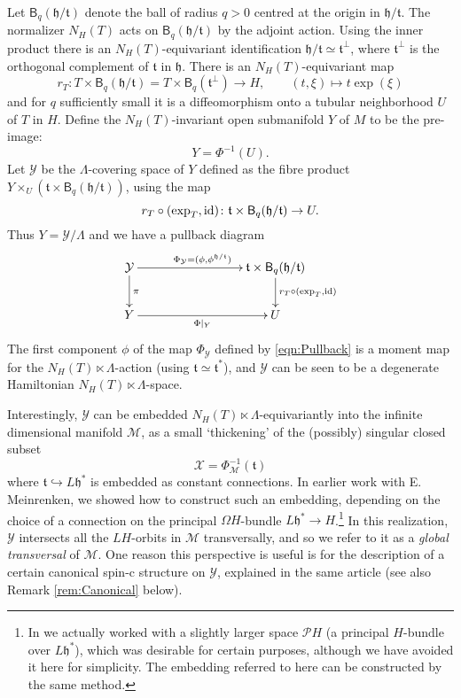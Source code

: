 \documentclass[11pt,reqno]{amsart}
\theoremstyle{definition}
\theoremstyle{remark}
\newcommand{\st}[1]{\mathsf{#1}}
\def\t{\ensuremath{\mathfrak{t}}}
\def\h{\ensuremath{\mathfrak{h}}}
\def\P{\ensuremath{\mathcal{P}}}
\def\Y{\ensuremath{\mathcal{Y}}}
\def\X{\ensuremath{\mathcal{X}}}
\def\M{\ensuremath{\mathcal{M}}}
\def\id{\ensuremath{\textnormal{id}}}
\begin{document}
Let $\st{B}_q(\h/\t)$ denote the ball of radius $q>0$ centred at the origin in $\h/\t$.  The normalizer $N_H(T)$ acts on $\st{B}_q(\h/\t)$ by the adjoint action.  Using the inner product there is an $N_H(T)$-equivariant identification $\h/\t \simeq \t^\perp$, where $\t^\perp$ is the orthogonal complement of $\t$ in $\h$.  There is an $N_H(T)$-equivariant map
\[ r_T \colon T \times \st{B}_q(\h/\t)=T \times \st{B}_q(\t^\perp) \rightarrow H, \qquad (t,\xi) \mapsto t\exp(\xi) \]
and for $q$ sufficiently small it is a diffeomorphism onto a tubular neighborhood $U$ of $T$ in $H$.  Define the $N_H(T)$-invariant open submanifold $Y$ of $M$ to be the pre-image:
\[ Y=\Phi^{-1}(U).\]
Let $\Y$ be the $\Lambda$-covering space of $Y$ defined as the fibre product $Y \times_U (\t \times \st{B}_q(\h/\t))$, using the map
\[ r_T \circ (\exp_T,\id) \colon \t \times \st{B}_q(\h/\t) \rightarrow U.\]  
Thus $Y=\Y/\Lambda$ and we have a pullback diagram  
\begin{equation} 
\label{eqn:Pullback}
\xymatrixcolsep{7pc}
\xymatrix{
\Y \ar[r]^{\Phi_{\Y}=(\phi,\phi^{\h/\t})} \ar[d]^{\pi} & \t \times \st{B}_q(\h/\t) \ar[d]^{r_T\circ (\exp_T,\id)} \\
Y \ar[r]_{\Phi|_Y} & U
}
\end{equation}
The first component $\phi$ of the map $\Phi_{\Y}$ defined by \eqref{eqn:Pullback} is a moment map for the $N_H(T)\ltimes \Lambda$-action (using $\t \simeq \t^\ast$), and $\Y$ can be seen to be a degenerate Hamiltonian $N_H(T) \ltimes \Lambda$-space.

Interestingly, $\Y$ can be embedded $N_H(T)\ltimes \Lambda$-equivariantly into the infinite dimensional manifold $\M$, as a small `thickening' of the (possibly) singular closed subset
\[ \X=\Phi_{\M}^{-1}(\t) \]
where $\t \hookrightarrow L\h^\ast$ is embedded as constant connections.  In earlier work \cite[Section 6.4]{LMSspinor} with E. Meinrenken, we showed how to construct such an embedding, depending on the choice of a connection on the principal $\Omega H$-bundle $L\h^\ast \rightarrow H$.\footnote{In \cite{LMSspinor} we actually worked with a slightly larger space $\P H$ (a principal $H$-bundle over $L\h^\ast$), which was desirable for certain purposes, although we have avoided it here for simplicity.  The embedding referred to here can be constructed by the same method.}  In this realization, $\Y$ intersects all the $LH$-orbits in $\M$ transversally, and so we refer to it as a \emph{global transversal} of $\M$.  One reason this perspective is useful is for the description of a certain canonical spin-c structure on $\Y$, explained in the same article \cite{LMSspinor} (see also Remark \ref{rem:Canonical} below).
\end{document}
